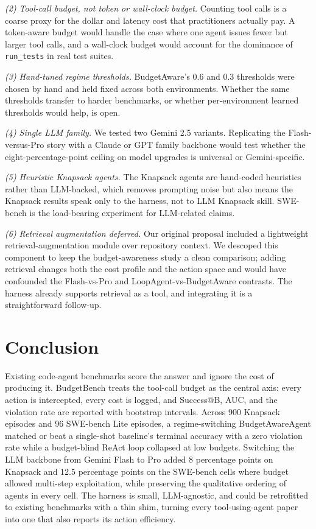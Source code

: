 \documentclass[11pt]{article}
\begin{document}
\textit{(2) Tool-call budget, not token or wall-clock budget.}
Counting tool calls is a coarse proxy for the dollar and latency cost
that practitioners actually pay. A token-aware budget would handle the
case where one agent issues fewer but larger tool calls, and a
wall-clock budget would account for the dominance of \texttt{run\_tests}
in real test suites.

\textit{(3) Hand-tuned regime thresholds.} BudgetAware's $0.6$ and
$0.3$ thresholds were chosen by hand and held fixed across both
environments. Whether the same thresholds transfer to harder
benchmarks, or whether per-environment learned thresholds would help,
is open.

\textit{(4) Single LLM family.} We tested two Gemini 2.5 variants.
Replicating the Flash-versus-Pro story with a Claude or GPT family
backbone would test whether the eight-percentage-point ceiling on
model upgrades is universal or Gemini-specific.

\textit{(5) Heuristic Knapsack agents.} The Knapsack agents are
hand-coded heuristics rather than LLM-backed, which removes prompting
noise but also means the Knapsack results speak only to the harness,
not to LLM Knapsack skill. SWE-bench is the load-bearing experiment
for LLM-related claims.

\textit{(6) Retrieval augmentation deferred.} Our original proposal
included a lightweight retrieval-augmentation module over repository
context. We descoped this component to keep the budget-awareness
study a clean comparison; adding retrieval changes both the cost
profile and the action space and would have confounded the Flash-vs-Pro
and LoopAgent-vs-BudgetAware contrasts. The harness already supports
retrieval as a tool, and integrating it is a straightforward
follow-up.

\section{Conclusion}
\label{sec:conclusion}

Existing code-agent benchmarks score the answer and ignore the cost of
producing it. BudgetBench treats the tool-call budget as the central
axis: every action is intercepted, every cost is logged, and Success@B,
AUC, and the violation rate are reported with bootstrap intervals.
Across 900 Knapsack episodes and 96 SWE-bench Lite episodes, a
regime-switching BudgetAwareAgent matched or beat a single-shot
baseline's terminal accuracy with a zero violation rate while a
budget-blind ReAct loop collapsed at low budgets. Switching
the LLM backbone from Gemini Flash to Pro added 8 percentage points
on Knapsack and 12.5 percentage points on the SWE-bench cells where
budget allowed multi-step exploitation, while preserving the
qualitative ordering of agents in every cell. The harness is small,
LLM-agnostic, and could be retrofitted to existing benchmarks with a
thin shim, turning every tool-using-agent paper into one that also
reports its action efficiency.
\end{document}
